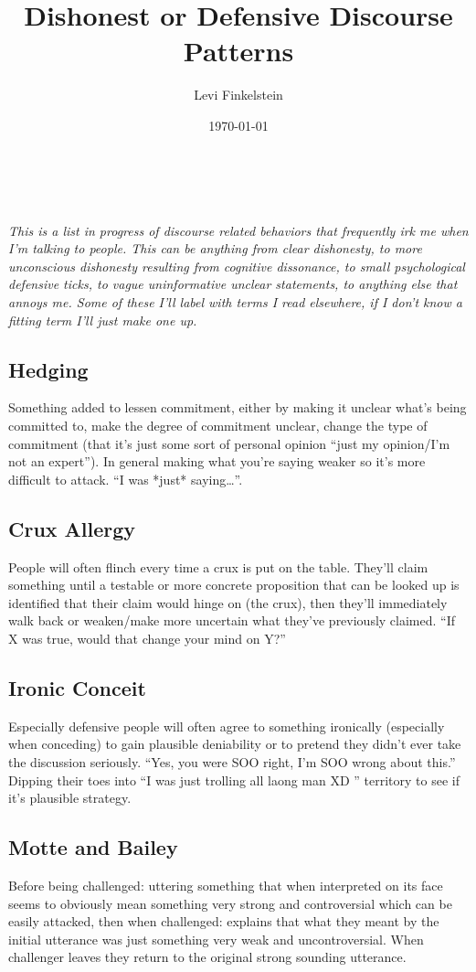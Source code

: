 \documentclass[12pt,english]{article}
\title{Dishonest or Defensive Discourse Patterns}
\author{Levi Finkelstein}
\date{\today}
\begin{document}
\maketitle
\\\\
\it{This is a list in progress of discourse related behaviors that frequently irk me when I'm talking to people. This can be anything from clear dishonesty, to more unconscious dishonesty resulting from cognitive dissonance, to small  psychological defensive ticks, to vague uninformative unclear statements, to anything else that annoys me. Some of these I'll label with terms I read elsewhere, if I don't know a fitting term I'll just make one up.}

\subsection*{Hedging} Something added to lessen commitment, either by making it unclear what’s being committed to, make the degree of commitment unclear, change the type of commitment (that it’s just some sort of personal opinion “just my opinion/I’m not an expert”). In general making what you’re saying weaker so it’s more difficult to attack. “I was *just* saying…”.

\subsection*{Crux Allergy} People will often flinch every time a crux is put on the table. They’ll claim something until a testable or more concrete proposition that can be looked up is identified that their claim would hinge on (the crux), then they’ll immediately walk back or weaken/make more uncertain what they’ve previously claimed. “If X was true, would that change your mind on Y?”

\subsection*{Ironic Conceit} Especially defensive people will often agree to something ironically (especially when conceding) to gain plausible deniability or to pretend they didn’t ever take the discussion seriously. “Yes, you were SOO right, I’m SOO wrong about this.” Dipping their toes into “I was just trolling all laong man XD '' territory to see if it’s plausible strategy.

\subsection*{Motte and Bailey} Before being challenged: uttering something that when interpreted on its face seems to obviously mean something very strong and controversial which can be easily attacked, then when challenged: explains that what they meant by the initial utterance was just something very weak and uncontroversial. When challenger leaves they return to the original strong sounding utterance. 
\end{document}
